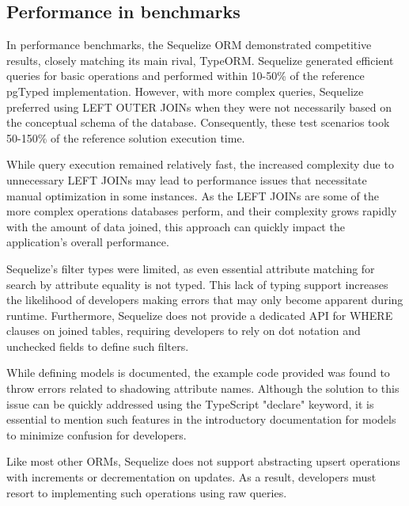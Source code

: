 \subsection*{Performance in benchmarks}

In performance benchmarks, the Sequelize ORM demonstrated competitive results,
closely matching its main rival, TypeORM. Sequelize generated efficient queries
for basic operations and performed within 10-50\% of the reference pgTyped
implementation. However, with more complex queries, Sequelize preferred using
LEFT OUTER JOINs when they were not necessarily based on the conceptual schema
of the database. Consequently, these test scenarios took 50-150\% of the
reference solution execution time.

While query execution remained relatively fast, the increased complexity due to
unnecessary LEFT JOINs may lead to performance issues that necessitate manual
optimization in some instances. As the LEFT JOINs are some of the more complex
operations databases perform, and their complexity grows rapidly with the amount
of data joined, this approach can quickly impact the application's overall
performance.

Sequelize's filter types were limited, as even essential attribute matching for
search by attribute equality is not typed. This lack of typing support increases
the likelihood of developers making errors that may only become apparent during
runtime. Furthermore, Sequelize does not provide a dedicated API for WHERE
clauses on joined tables, requiring developers to rely on dot notation and
unchecked fields to define such filters.

While defining models is documented, the example code provided was found to
throw errors related to shadowing attribute names. Although the solution to this
issue can be quickly addressed using the TypeScript "declare" keyword, it is
essential to mention such features in the introductory documentation for models
to minimize confusion for developers.

Like most other ORMs, Sequelize does not support abstracting upsert operations
with increments or decrementation on updates. As a result, developers must
resort to implementing such operations using raw queries.